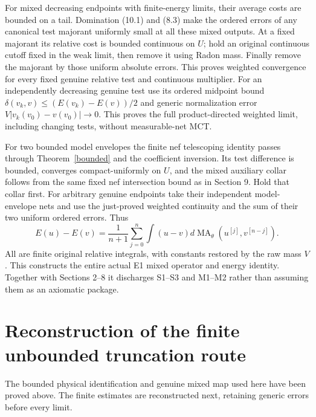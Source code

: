 \documentclass[10pt]{article}
\newcommand{\MA}{\operatorname{MA}}
\begin{document}
For mixed decreasing endpoints with finite-energy limits, their average
costs are bounded on a tail. Domination (10.1) and (8.3) make the ordered
errors of any canonical test majorant uniformly small at all these mixed
outputs. At a fixed majorant its relative cost is bounded continuous on
$U$; hold an original continuous cutoff fixed in the weak limit, then
remove it using Radon mass. Finally remove the majorant by those uniform
absolute errors. This proves weighted convergence for every fixed genuine
relative test and continuous multiplier. For an independently decreasing
genuine test use its ordered midpoint bound
$\delta(v_k,v)\leq(E(v_k)-E(v))/2$ and generic normalization error
$V|v_k(v_0)-v(v_0)|\to0$. This proves the full product-directed weighted
limit, including changing tests, without measurable-net MCT.

For two bounded model envelopes the finite nef telescoping identity passes
through Theorem~\ref{bounded} and the coefficient inversion. Its test
difference is bounded, converges compact-uniformly on $U$, and the mixed
auxiliary collar follows from the same fixed nef intersection bound as
in Section 9. Hold that collar first. For arbitrary genuine endpoints
take their independent model-envelope nets and use the just-proved weighted
continuity and the sum of their two uniform ordered errors. Thus
\[
 E(u)-E(v)=\frac1{n+1}\sum_{j=0}^n
 \int(u-v)d\MA_\theta(u^{[j]},v^{[n-j]}).
 \tag{10.2}
\]
All are finite original relative integrals, with constants restored by
the raw mass $V$. This constructs the entire actual E1 mixed operator
and energy identity. Together with Sections 2--8 it discharges S1--S3
and M1--M2 rather than assuming them as an axiomatic package.

\section{Reconstruction of the finite unbounded truncation route}
The bounded physical identification and genuine mixed map used here have
been proved above. The finite estimates are reconstructed next, retaining
generic errors before every limit.
\end{document}
